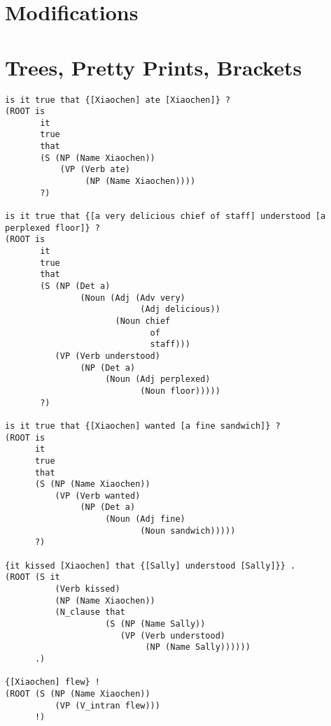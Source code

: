 \documentclass[11pt]{article}
\begin{document}
\newpage

\section{Modifications}

\newpage

\section{Trees, Pretty Prints, Brackets}
\begin{lstlisting}
is it true that {[Xiaochen] ate [Xiaochen]} ? 
(ROOT is 
       it 
       true 
       that 
       (S (NP (Name Xiaochen)) 
           (VP (Verb ate) 
                (NP (Name Xiaochen)))) 
       ?) 
       
is it true that {[a very delicious chief of staff] understood [a perplexed floor]} ? 
(ROOT is 
       it 
       true 
       that 
       (S (NP (Det a) 
               (Noun (Adj (Adv very) 
                           (Adj delicious)) 
                      (Noun chief 
                             of 
                             staff))) 
          (VP (Verb understood) 
               (NP (Det a) 
                    (Noun (Adj perplexed) 
                           (Noun floor))))) 
       ?) 
       
is it true that {[Xiaochen] wanted [a fine sandwich]} ? 
(ROOT is 
      it 
      true 
      that 
      (S (NP (Name Xiaochen)) 
          (VP (Verb wanted) 
               (NP (Det a) 
                    (Noun (Adj fine) 
                           (Noun sandwich))))) 
      ?) 
      
{it kissed [Xiaochen] that {[Sally] understood [Sally]}} . 
(ROOT (S it 
          (Verb kissed) 
          (NP (Name Xiaochen)) 
          (N_clause that 
                    (S (NP (Name Sally)) 
                       (VP (Verb understood) 
                            (NP (Name Sally)))))) 
      .) 
      
{[Xiaochen] flew} ! 
(ROOT (S (NP (Name Xiaochen)) 
          (VP (V_intran flew))) 
      !) 
\end{lstlisting}
\end{document}
